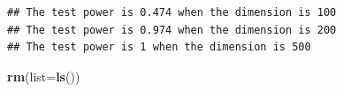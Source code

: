 \documentclass[
]{article}
\newenvironment{Shaded}{\begin{snugshade}}{\end{snugshade}}
\newcommand{\AttributeTok}[1]{\textcolor[rgb]{0.13,0.29,0.53}{#1}}
\newcommand{\FunctionTok}[1]{\textcolor[rgb]{0.13,0.29,0.53}{\textbf{#1}}}
\newcommand{\NormalTok}[1]{#1}
\begin{document}
\begin{verbatim}
## The test power is 0.474 when the dimension is 100 
## The test power is 0.974 when the dimension is 200 
## The test power is 1 when the dimension is 500
\end{verbatim}

\begin{Shaded}
\begin{Highlighting}[]
\FunctionTok{rm}\NormalTok{(}\AttributeTok{list=}\FunctionTok{ls}\NormalTok{())}
\end{Highlighting}
\end{Shaded}
\end{document}
